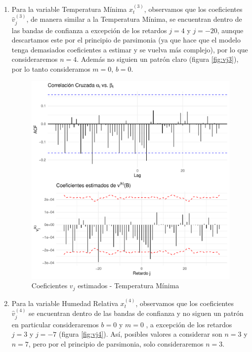 \documentclass[12pt,oneside]{book}\usepackage[]{graphicx}\usepackage[]{color}
\makeatletter
\def\maxwidth{ %
  \ifdim\Gin@nat@width>\linewidth
    \linewidth
  \else
    \Gin@nat@width
  \fi
}
\newenvironment{knitrout}{}{} %
\theoremstyle{definition} %
\makeatother
\begin{document}
\begin{enumerate}
\item Para la variable Temperatura Mínima $x_t^{(3)}$, observamos que los coeficientes $\hat v_j^{(3)}$, de manera similar a la Temperatura Mínima, se encuentran dentro de las bandas de confianza a excepción de los retardos $j=4$ y $j=-20$, aunque descartamos este por el principio de parsimonia (ya que hace que el modelo tenga demasiados coeficientes a estimar y se vuelva más complejo), por lo que consideraremos $n=4$. Además no siguien un patrón claro (figura \ref{fig:vj3}), por lo tanto consideramos $m=0$, $b=0$. 


\begin{knitrout}
\color{fgcolor}\begin{figure}[H]

{\centering \includegraphics[width=\maxwidth]{figure/unnamed-chunk-42-1} 

}

\caption{\label{fig:vj3} Coeficientes $v_j$ estimados - Temperatura Mínima }\label{fig:unnamed-chunk-42}
\end{figure}


\end{knitrout}



\item Para la variable Humedad Relativa $x_t^{(4)}$, observamos que los coeficientes $\hat v_j^{(4)}$ se encuentran dentro de las bandas de confianza y no siguen un patrón en particular consideraremos $b=0$ y $m=0$ , a excepción de los retardos $j=3$ y $j=-7$ (figura \ref{fig:vj4}). Así, posibles valores a considerar son $n=3$ y $n=7$, pero por el principio de parsimonia, solo consideraremos $n=3$.




\end{enumerate}
\end{document}

